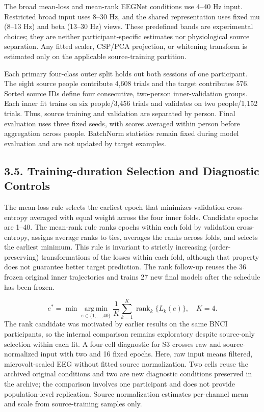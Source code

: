 \documentclass[11pt]{article}
\begin{document}
The broad mean-loss and mean-rank EEGNet conditions use 4--40 Hz input. Restricted broad input uses 8--30 Hz, and the shared representation uses fixed mu (8--13 Hz) and beta (13--30 Hz) views. These predefined bands are experimental choices; they are neither participant-specific estimates nor physiological source separation. Any fitted scaler, CSP/PCA projection, or whitening transform is estimated only on the applicable source-training partition.

Each primary four-class outer split holds out both sessions of one participant. The eight source people contribute 4,608 trials and the target contributes 576. Sorted source IDs define four consecutive, two-person inner-validation groups. Each inner fit trains on six people/3,456 trials and validates on two people/1,152 trials. Thus, source training and validation are separated by person. Final evaluation uses three fixed seeds, with scores averaged within person before aggregation across people. BatchNorm statistics remain fixed during model evaluation and are not updated by target examples.

\subsection*{3.5. Training-duration Selection and Diagnostic Controls}
The mean-loss rule selects the earliest epoch that minimizes validation cross-entropy averaged with equal weight across the four inner folds. Candidate epochs are 1--40. The mean-rank rule ranks epochs within each fold by validation cross-entropy, assigns average ranks to ties, averages the ranks across folds, and selects the earliest minimum. This rule is invariant to strictly increasing (order-preserving) transformations of the losses within each fold, although that property does not guarantee better target prediction. The rank follow-up reuses the 36 frozen original inner trajectories and trains 27 new final models after the schedule has been frozen.

\begin{equation*}
e^*=\min\operatorname*{arg\,min}_{e\in\{1,\ldots,40\}}\frac{1}{K}\sum_{k=1}^{K}\operatorname{rank}_{k}\{L_k(e)\},\quad K=4.
\end{equation*}
The rank candidate was motivated by earlier results on the same BNCI participants, so the internal comparison remains exploratory despite source-only selection within each fit. A four-cell diagnostic for S3 crosses raw and source-normalized input with two and 16 fixed epochs. Here, raw input means filtered, microvolt-scaled EEG without fitted source normalization. Two cells reuse the archived original conditions and two are new diagnostic conditions preserved in the archive; the comparison involves one participant and does not provide population-level replication. Source normalization estimates per-channel mean and scale from source-training samples only.
\end{document}

